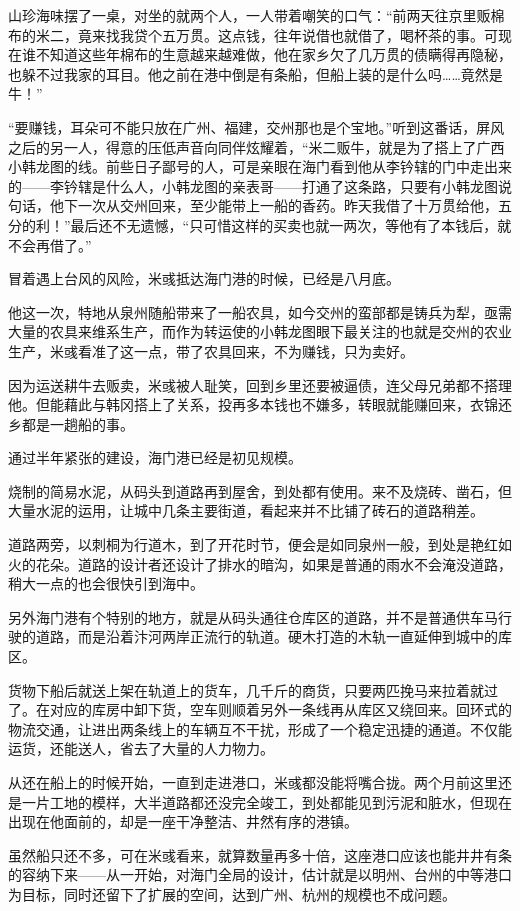 山珍海味摆了一桌，对坐的就两个人，一人带着嘲笑的口气：“前两天往京里贩棉布的米二，竟来找我贷个五万贯。这点钱，往年说借也就借了，喝杯茶的事。可现在谁不知道这些年棉布的生意越来越难做，他在家乡欠了几万贯的债瞒得再隐秘，也躲不过我家的耳目。他之前在港中倒是有条船，但船上装的是什么吗……竟然是牛！”

“要赚钱，耳朵可不能只放在广州、福建，交州那也是个宝地。”听到这番话，屏风之后的另一人，得意的压低声音向同伴炫耀着，“米二贩牛，就是为了搭上了广西小韩龙图的线。前些日子鄙号的人，可是亲眼在海门看到他从李钤辖的门中走出来的——李钤辖是什么人，小韩龙图的亲表哥——打通了这条路，只要有小韩龙图说句话，他下一次从交州回来，至少能带上一船的香药。昨天我借了十万贯给他，五分的利！”最后还不无遗憾，“只可惜这样的买卖也就一两次，等他有了本钱后，就不会再借了。”

冒着遇上台风的风险，米彧抵达海门港的时候，已经是八月底。

他这一次，特地从泉州随船带来了一船农具，如今交州的蛮部都是铸兵为犁，亟需大量的农具来维系生产，而作为转运使的小韩龙图眼下最关注的也就是交州的农业生产，米彧看准了这一点，带了农具回来，不为赚钱，只为卖好。

因为运送耕牛去贩卖，米彧被人耻笑，回到乡里还要被逼债，连父母兄弟都不搭理他。但能藉此与韩冈搭上了关系，投再多本钱也不嫌多，转眼就能赚回来，衣锦还乡都是一趟船的事。

通过半年紧张的建设，海门港已经是初见规模。

烧制的简易水泥，从码头到道路再到屋舍，到处都有使用。来不及烧砖、凿石，但大量水泥的运用，让城中几条主要街道，看起来并不比铺了砖石的道路稍差。

道路两旁，以刺桐为行道木，到了开花时节，便会是如同泉州一般，到处是艳红如火的花朵。道路的设计者还设计了排水的暗沟，如果是普通的雨水不会淹没道路，稍大一点的也会很快引到海中。

另外海门港有个特别的地方，就是从码头通往仓库区的道路，并不是普通供车马行驶的道路，而是沿着汴河两岸正流行的轨道。硬木打造的木轨一直延伸到城中的库区。

货物下船后就送上架在轨道上的货车，几千斤的商货，只要两匹挽马来拉着就过了。在对应的库房中卸下货，空车则顺着另外一条线再从库区又绕回来。回环式的物流交通，让进出两条线上的车辆互不干扰，形成了一个稳定迅捷的通道。不仅能运货，还能送人，省去了大量的人力物力。

从还在船上的时候开始，一直到走进港口，米彧都没能将嘴合拢。两个月前这里还是一片工地的模样，大半道路都还没完全竣工，到处都能见到污泥和脏水，但现在出现在他面前的，却是一座干净整洁、井然有序的港镇。

虽然船只还不多，可在米彧看来，就算数量再多十倍，这座港口应该也能井井有条的容纳下来——从一开始，对海门全局的设计，估计就是以明州、台州的中等港口为目标，同时还留下了扩展的空间，达到广州、杭州的规模也不成问题。

